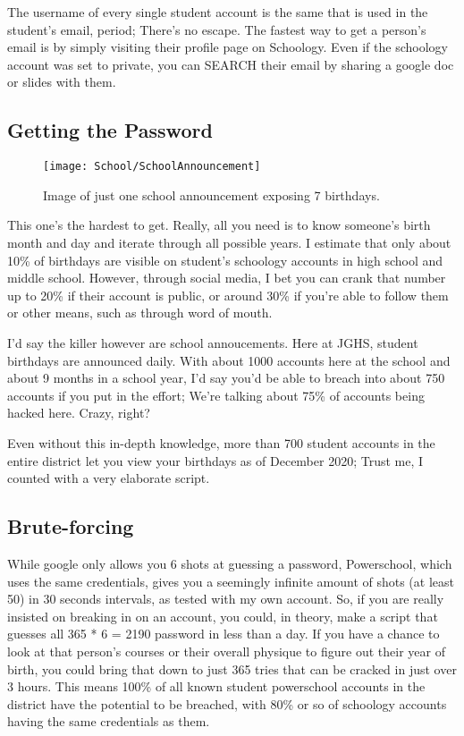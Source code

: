The username of every single student account is the same that is used in the student's email, period; There's no escape. The fastest way to get a person's email is by simply visiting their profile page on Schoology. Even if the schoology account was set to private, you can SEARCH their email by sharing a google doc or slides with them.

\subsection*{Getting the Password}

\begin{figure}[h]
    \centering
    \texttt{[image: School/SchoolAnnouncement]}
    \caption{
        Image of just one school announcement exposing 7 birthdays.
    }
\end{figure}


This one's the hardest to get. Really, all you need is to know someone's birth month and day and iterate through all possible years. I estimate that only about 10\% of birthdays are visible on student's schoology accounts in high school and middle school. However, through social media, I bet you can crank that number up to 20\% if their account is public, or around 30\% if you're able to follow them or other means, such as through word of mouth.

I'd say the killer however are school annoucements. Here at JGHS, student birthdays are announced daily. With about 1000 accounts here at the school and about 9 months in a school year, I'd say you'd be able to breach into about 750 accounts if you put in the effort; We're talking about 75\% of accounts being hacked here. Crazy, right?

Even without this in-depth knowledge, more than 700 student accounts in the entire district let you view your birthdays as of December 2020; Trust me, I counted with a very elaborate script.

\subsection*{Brute-forcing}

While google only allows you 6 shots at guessing a password, Powerschool, which uses the same credentials, gives you a seemingly infinite amount of shots (at least 50) in 30 seconds intervals, as tested with my own account. So, if you are really insisted on breaking in on an account, you could, in theory, make a script that guesses all 365 * 6 = 2190 password in less than a day. If you have a chance to look at that person's courses or their overall physique to figure out their year of birth, you could bring that down to just 365 tries that can be cracked in just over 3 hours. This means 100\% of all known student powerschool accounts in the district have the potential to be breached, with 80\% or so of schoology accounts having the same credentials as them.


